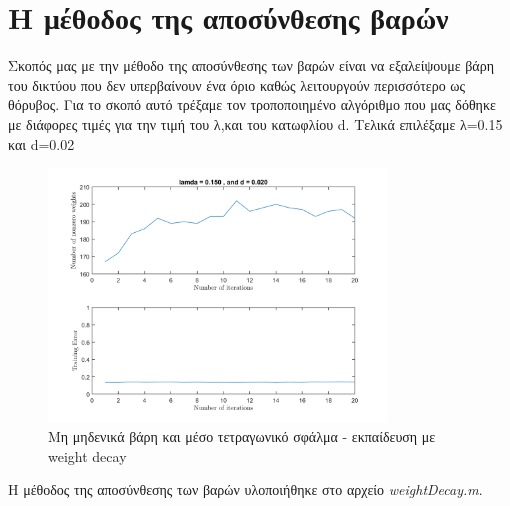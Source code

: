 \documentclass[12pt]{article}
\begin{document}
\section*{Η μέθοδος της αποσύνθεσης βαρών }
Σκοπός μας με την μέθοδο της αποσύνθεσης των βαρών είναι να εξαλείψουμε βάρη του δικτύου που δεν υπερβαίνουν ένα όριο καθώς λειτουργούν περισσότερο ως θόρυβος. Για το σκοπό αυτό τρέξαμε τον τροποποιημένο αλγόριθμο που μας δόθηκε με διάφορες τιμές για την τιμή του λ,και του κατωφλίου d. Τελικά επιλέξαμε λ=0.15 και d=0.02  
\begin{figure}[H]
	 		\centering
			\includegraphics[width=0.8\textwidth]{fakelos/weight4.png}
			\caption{Μη μηδενικά βάρη και μέσο τετραγωνικό σφάλμα - εκπαίδευση με weight decay }
			\label{fig:4.Learn-algo}
		\end{figure}		
		
Η μέθοδος της αποσύνθεσης των βαρών υλοποιήθηκε στο αρχείο  \textit{weightDecay.m}. 	

%	

%	

%		
\end{document}

